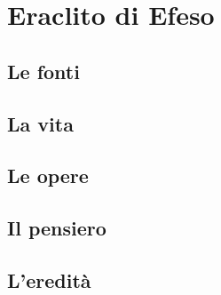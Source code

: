 \chapter{Eraclito di Efeso}

\section{Le fonti}

\section{La vita}

\section{Le opere}

\section{Il pensiero}

\section{L'eredità}

